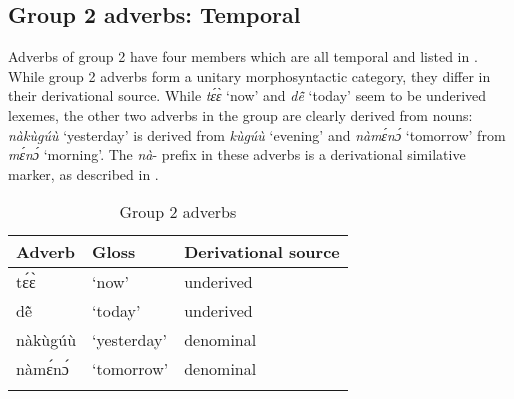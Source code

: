 \begin{table}
\caption{Morphosyntactic properties of locative deictics}
\label{Tab:LOCdeic}
\end{table} 

\subsection{Group 2 adverbs: Temporal}
\label{sec:G2ADV}

Adverbs of group 2 have four members which are all temporal and listed in . While group 2 adverbs form a unitary morphosyntactic category, they differ in their derivational source. While {\itshape tɛ́ɛ̀} `now' and {\itshape dẽ̂} `today' seem to be underived lexemes, the other two adverbs in the group are clearly derived from nouns: {\itshape nàkùgúù} `yesterday' is derived from {\itshape kùgúù} `evening' and {\itshape nàmɛ́nɔ́} `tomorrow' from {\itshape mɛ́nɔ́} `morning'. The {\itshape nà}- prefix in these adverbs is a derivational similative marker, as described in .


\begin{table}
\begin{tabular}{ll l}
\lsptoprule
Adverb & Gloss & Derivational source \\  \midrule
tɛ́ɛ̀ & `now' & underived \\
dẽ̂ & `today'  & underived\\
nàkùgúù & `yesterday' & denominal \\
nàmɛ́nɔ́ & `tomorrow' & denominal \\
\lspbottomrule
\end{tabular}
\caption{Group 2 adverbs}
\label{Tab:ADVGroup2}
\end{table} 


